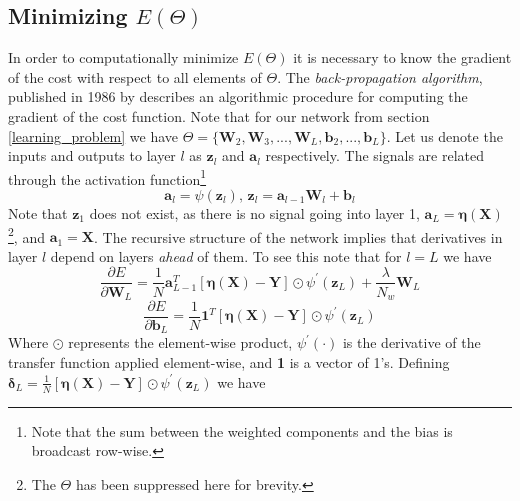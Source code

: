 \subsection{Minimizing $E(\Theta)$}

In order to computationally minimize $E(\Theta)$ it is necessary to know the gradient of the cost with respect to all elements of $\Theta$. The \textit{back-propagation algorithm}, published in 1986 by \cite{rumelhart1988l} describes an algorithmic procedure for computing the gradient of the cost function. Note that for our network from section \ref{learning_problem} we have $\Theta=\lbrace \textbf{W}_2, \textbf{W}_3, ..., \textbf{W}_L, \textbf{b}_2, ..., \textbf{b}_{L} \rbrace$. Let us denote the inputs and outputs to layer $l$ as $\textbf{z}_l$ and $\textbf{a}_l$ respectively. The signals are related through the activation function\footnote{Note that the sum between the weighted components and the bias is broadcast row-wise.}
\begin{equation}
\textbf{a}_l = \psi(\textbf{z}_l), \, \textbf{z}_l = \textbf{a}_{l - 1}\textbf{W}_l + \textbf{b}_l
\end{equation}
Note that $\textbf{z}_1$ does not exist, as there is no signal going into layer 1, $\textbf{a}_L = \boldsymbol{\eta}(\textbf{X})$\footnote{The $\Theta$ has been suppressed here for brevity.}, and $\textbf{a}_1 = \textbf{X}$. The recursive structure of the network implies that derivatives in layer $l$ depend on layers \textit{ahead} of them. To see this note that for $l=L$ we have
\begin{equation*}
\frac{\partial E}{\partial \textbf{W}_L} = 
\frac{1}{N} \textbf{a}^T_{L - 1}
\left[\boldsymbol{\eta}(\textbf{X}) - \textbf{Y}\right] \odot
\psi^{\prime}(\textbf{z}_{L}) + \frac{\lambda}{N_w}\textbf{W}_L
\end{equation*}
\begin{equation*}
\frac{\partial E}{\partial \textbf{b}_L} = 
\frac{1}{N} \textbf{1}^T
\left[\boldsymbol{\eta}(\textbf{X}) - \textbf{Y}\right] \odot
\psi^{\prime}(\textbf{z}_{L})
\end{equation*}
Where $\odot$ represents the element-wise product, $\psi^{\prime}(\cdot)$ is the derivative of the transfer function applied element-wise, and \textbf{1} is a vector of 1's. Defining $\boldsymbol{\delta}_{L} = \frac{1}{N} \left[\boldsymbol{\eta}(\textbf{X}) - \textbf{Y}\right] \odot \psi^{\prime}(\textbf{z}_{L})$ we have
